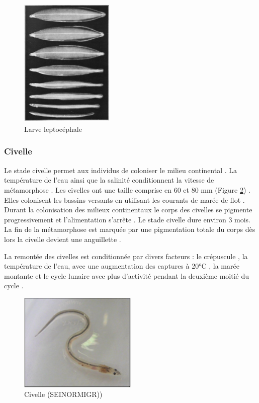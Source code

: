 \documentclass[11pt,titlepage,twoside]{article}\usepackage[]{graphicx}\usepackage[table]{xcolor}
\begin{document}
\begin{figure}[htpb]
\centering
\includegraphics[width=0.4\textwidth]{larve}
\caption{Larve leptocéphale}
\label{larve}
\end{figure}

\subsubsection{Civelle}

Le stade civelle permet aux individus de coloniser le milieu continental \citep{edeline_role_2005}. La température de l’eau ainsi que la salinité conditionnent la vitesse de métamorphose \citep{laffaille_point_2005}. Les civelles ont une taille comprise en 60 et 80 mm (Figure \ref{civelle}) \citep{adam_anguille_2008}.  Elles colonisent les bassins versants en utilisant les courants de marée de flot \citep{hirschinger_donnees_2015}. Durant la colonisation des milieux continentaux le corps des civelles se pigmente progressivement \citep{prouzet_etude_2003} et l’alimentation s’arrête \citep{prouzet_historique_2002} . Le stade civelle dure environ 3 mois. La fin de la métamorphose est marquée par une pigmentation totale du corps dès lors la civelle devient une anguillette \citep{laffaille_role_2000}.

La remontée des civelles est conditionnée par divers facteurs : le crépuscule \citep{bardonnet_influence_2003, bardonnet_etude_2005}, la température de l’eau, avec une augmentation des captures à 20°C \citep{white_environmental_1997}, la marée montante \citep{bardonnet_influence_2003} et le cycle lunaire avec plus d’activité pendant la deuxième moitié du cycle \citep{todd_timing_1981}. 

\begin{figure}[htpb]
\centering
\includegraphics[width=0.5\textwidth]{civelle}
\caption{Civelle (SEINORMIGR))}
\label{civelle}
\end{figure}
\end{document}
